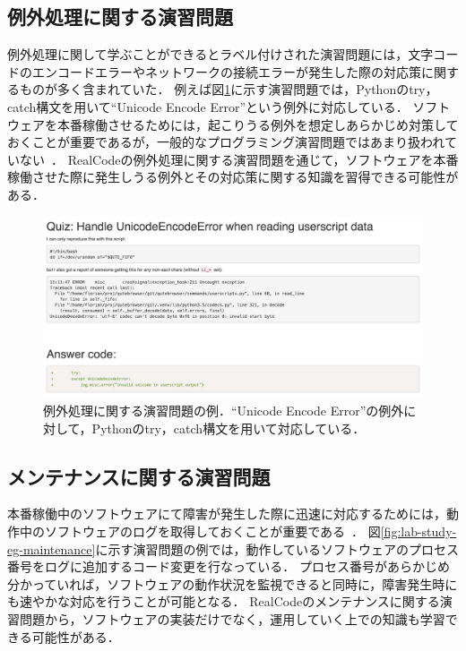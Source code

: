 \subsection{例外処理に関する演習問題}

例外処理に関して学ぶことができるとラベル付けされた演習問題には，文字コードのエンコードエラーやネットワークの接続エラーが発生した際の対応策に関するものが多く含まれていた．
例えば図\ref{fig:lab-study-eg-exception}に示す演習問題では，Pythonのtry，catch構文を用いて``Unicode Encode Error''という例外に対応している．
ソフトウェアを本番稼働させるためには，起こりうる例外を想定しあらかじめ対策しておくことが重要であるが，一般的なプログラミング演習問題ではあまり扱われていない~\cite{Piteira_Learning_Computer_Programming}．
RealCodeの例外処理に関する演習問題を通じて，ソフトウェアを本番稼働させた際に発生しうる例外とその対応策に関する知識を習得できる可能性がある．

\begin{figure}[H]
  \centering
  \includegraphics[width=1.0\columnwidth]{20190107-lab-study-exception-exercise2.png}
  \caption{例外処理に関する演習問題の例．``Unicode Encode Error''の例外に対して，Pythonのtry，catch構文を用いて対応している．}
  \label{fig:lab-study-eg-exception}
\end{figure}


\subsection{メンテナンスに関する演習問題}

本番稼働中のソフトウェアにて障害が発生した際に迅速に対応するためには，動作中のソフトウェアのログを取得しておくことが重要である~\cite{kernighan1999practice}．
図\ref{fig:lab-study-eg-maintenance}に示す演習問題の例では，動作しているソフトウェアのプロセス番号をログに追加するコード変更を行なっている．
プロセス番号があらかじめ分かっていれば，ソフトウェアの動作状況を監視できると同時に，障害発生時にも速やかな対応を行うことが可能となる．
RealCodeのメンテナンスに関する演習問題から，ソフトウェアの実装だけでなく，運用していく上での知識も学習できる可能性がある．

